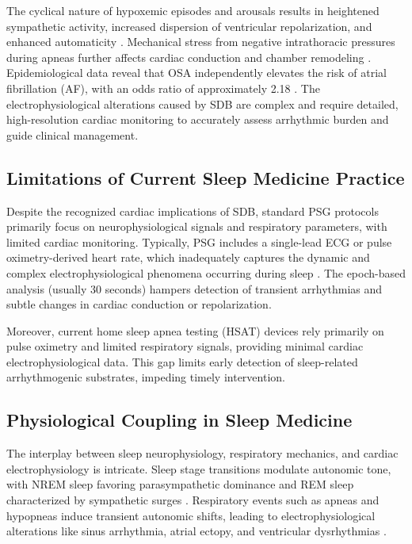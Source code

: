 \documentclass[10pt, conference]{IEEEtran}
\begin{document}
The cyclical nature of hypoxemic episodes and arousals results in heightened sympathetic activity, increased dispersion of ventricular repolarization, and enhanced automaticity \cite{guilleminault1983}. Mechanical stress from negative intrathoracic pressures during apneas further affects cardiac conduction and chamber remodeling \cite{guilleminault1983}. Epidemiological data reveal that OSA independently elevates the risk of atrial fibrillation (AF), with an odds ratio of approximately 2.18 \cite{mehra2006}. The electrophysiological alterations caused by SDB are complex and require detailed, high-resolution cardiac monitoring to accurately assess arrhythmic burden and guide clinical management.

\subsection{Limitations of Current Sleep Medicine Practice}

Despite the recognized cardiac implications of SDB, standard PSG protocols primarily focus on neurophysiological signals and respiratory parameters, with limited cardiac monitoring. Typically, PSG includes a single-lead ECG or pulse oximetry-derived heart rate, which inadequately captures the dynamic and complex electrophysiological phenomena occurring during sleep \cite{berry2012}. The epoch-based analysis (usually 30 seconds) hampers detection of transient arrhythmias and subtle changes in cardiac conduction or repolarization.

Moreover, current home sleep apnea testing (HSAT) devices rely primarily on pulse oximetry and limited respiratory signals, providing minimal cardiac electrophysiological data. This gap limits early detection of sleep-related arrhythmogenic substrates, impeding timely intervention.

\subsection{Physiological Coupling in Sleep Medicine}

The interplay between sleep neurophysiology, respiratory mechanics, and cardiac electrophysiology is intricate. Sleep stage transitions modulate autonomic tone, with NREM sleep favoring parasympathetic dominance and REM sleep characterized by sympathetic surges \cite{trinder2010}. Respiratory events such as apneas and hypopneas induce transient autonomic shifts, leading to electrophysiological alterations like sinus arrhythmia, atrial ectopy, and ventricular dysrhythmias \cite{gami2005}.
\end{document}
